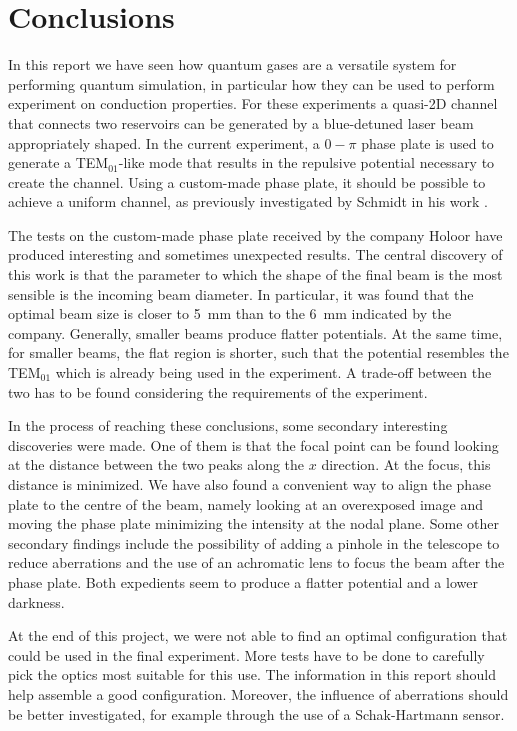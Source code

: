 \chapter{Conclusions}
In this report we have seen how quantum gases are a versatile system for performing quantum simulation, in particular how they can be used to perform experiment on conduction properties. For these experiments a quasi-2D channel that connects two reservoirs can be generated by a blue-detuned laser beam appropriately shaped. In the current experiment, a $0-\pi$ phase plate is used to generate a TEM$_01$-like mode that results in the repulsive potential necessary to create the channel. Using a custom-made phase plate, it should be possible to achieve a uniform channel, as previously investigated by Schmidt in his work \cite{schmidt2021}.

The tests on the custom-made phase plate received by the company Holoor have produced interesting and sometimes unexpected results. The central discovery of this work is that the parameter to which the shape of the final beam is the most sensible is the incoming beam diameter. In particular, it was found that the optimal beam size is closer to \SI{5}{mm} than to the \SI{6}{mm} indicated by the company. Generally, smaller beams produce flatter potentials. At the same time, for smaller beams, the flat region is shorter, such that the potential resembles the TEM$_{01}$ which is already being used in the experiment. A trade-off between the two has to be found considering the requirements of the experiment.

In the process of reaching these conclusions, some secondary interesting discoveries were made. One of them is that the focal point can be found looking at the distance between the two peaks along the $x$ direction. At the focus, this distance is minimized. We have also found a convenient way to align the phase plate to the centre of the beam, namely looking at an overexposed image and moving the phase plate minimizing the intensity at the nodal plane. Some other secondary findings include the  possibility of adding a pinhole in the telescope to reduce aberrations and the use of an achromatic lens to focus the beam after the phase plate. Both expedients seem to produce a flatter potential and a lower darkness.

At the end of this project, we were not able to find an optimal configuration that could be used in the final experiment. More tests have to be done to carefully pick the optics most suitable for this use. The information in this report should help assemble a good configuration. Moreover, the influence of aberrations should be better investigated, for example through the use of a Schak-Hartmann sensor.